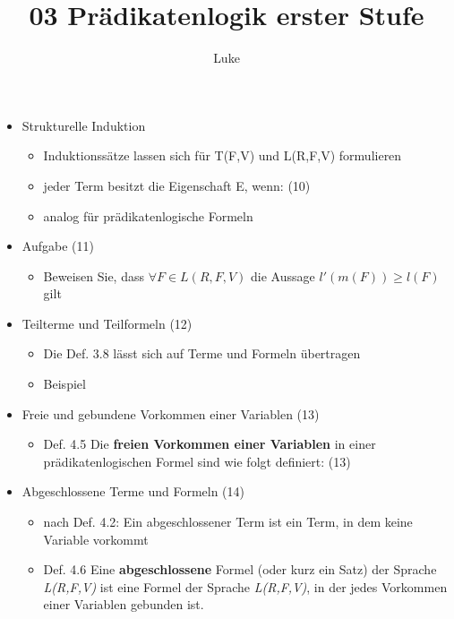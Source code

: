 \documentclass[a4paper, 12pt] {article} %
\title{03 Prädikatenlogik erster Stufe}
\begin{document}
\maketitle
\author{Luke}


\begin{itemize}
	\item Strukturelle Induktion
	\begin{itemize}
		\item Induktionssätze lassen sich für T(F,V) und L(R,F,V) 						formulieren
		\item jeder Term besitzt die Eigenschaft E, wenn: (10)
		\item analog für prädikatenlogische Formeln
	\end{itemize}
	\item Aufgabe (11)
	\begin{itemize}
		\item Beweisen Sie, dass \begin{math}\forall F \in L(R,F,V) 			\end{math} die Aussage \begin{math} l'(m(F))\ge l(F) \end{math} gilt 
	\end{itemize}
	\item Teilterme und Teilformeln (12)
	\begin{itemize}
		\item Die Def. 3.8 lässt sich auf Terme und Formeln übertragen
		\item Beispiel
	\end{itemize}
	\item Freie und gebundene Vorkommen einer Variablen (13)
	\begin{itemize}
		\item Def. 4.5 Die \textbf{freien Vorkommen einer Variablen} in 				einer prädikatenlogischen Formel sind wie folgt definiert: 					(13)
	\end{itemize}
	\item Abgeschlossene Terme und Formeln (14)
	\begin{itemize}
		\item nach Def. 4.2: Ein abgeschlossener Term ist ein Term, in 						dem	keine Variable vorkommt
		\item Def. 4.6 Eine \textbf{abgeschlossene} Formel (oder kurz 					ein Satz) der Sprache  \textit{L(R,F,V)} ist eine Formel der 			Sprache \textit{L(R,F,V)}, in der jedes Vorkommen einer 					Variablen gebunden ist.
	\end{itemize}

\end{itemize}
\end{document}

